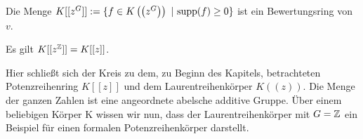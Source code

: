 %
%
%
%
%
%
%
\begin{satz}
Die Menge $K\lbrack\lbrack z^G\rbrack\rbrack := \lbrace f \in K\left(\left(z^G\right)\right)~ \vert~ \textup{supp}(f) \geq 0\rbrace$ ist ein Bewertungsring von $v$.
\end{satz}
%
%
%
%
%
%
%
%
\begin{bsp}
Es gilt $K\lbrack\lbrack z^{\mathbb{Z}}\rbrack\rbrack = K\lbrack\lbrack z\rbrack\rbrack$.
\end{bsp}
%
%
Hier schließt sich der Kreis zu dem, zu Beginn des Kapitels, betrachteten Potenzreihenring $K[[z]]$ und dem Laurentreihenkörper $K((z))$. Die Menge der ganzen Zahlen ist eine angeordnete abelsche additive Gruppe. Über einem beliebigen Körper K wissen wir nun, dass der Laurentreihenkörper mit $G = \mathbb{Z}$ ein Beispiel für einen formalen Potenzreihenkörper darstellt.
%
%
%
%
%
%
%
